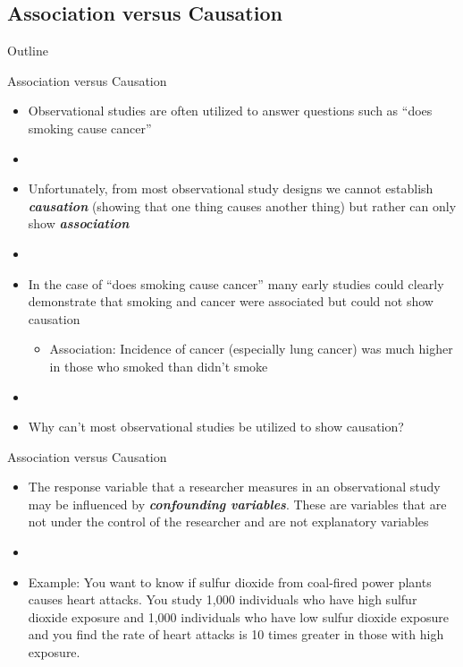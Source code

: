 \documentclass[xcolor=dvipsnames]{beamer}
\begin{document}
\subsection{Association versus Causation}
\begin{frame}{Outline}
\tableofcontents[currentsection,subsectionstyle=show/shaded/hide]
\end{frame}

\begin{frame}{Association versus Causation}
	\begin{itemize}
		\item Observational studies are often utilized to answer questions such as ``does smoking cause cancer''
		\item[]
		\item Unfortunately, from most observational study designs we cannot establish \textbf{\emph{causation}} (showing that one thing causes another thing) but rather can only show \textbf{\emph{association}}
		\item[]
		\item In the case of ``does smoking cause cancer'' many early studies could clearly demonstrate that smoking and cancer were associated but could not show causation
		\begin{itemize}
			\item Association: Incidence of cancer (especially lung cancer) was much higher in those who smoked than didn't smoke
		\end{itemize}
		\item[]
		\item Why can't most observational studies be utilized to show causation?
	\end{itemize}
\end{frame}

\begin{frame}{Association versus Causation}
	\begin{itemize}
		\item The response variable that a researcher measures in an observational study may be influenced by \textbf{\emph{confounding variables}}. These are variables that are not under the control of the researcher and are not explanatory variables
		\item[]
		\item Example: You want to know if sulfur dioxide from coal-fired power plants causes heart attacks. You study 1,000 individuals who have high sulfur dioxide exposure and 1,000 individuals who have low sulfur dioxide exposure and you find the rate of heart attacks is 10 times greater in those with high exposure.
	\end{itemize}
\end{frame}
\end{document}
